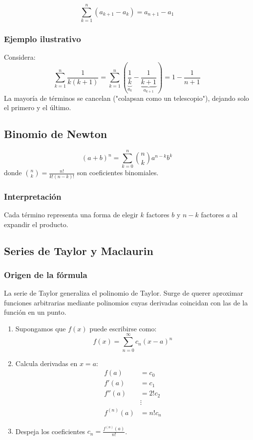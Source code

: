 \documentclass[letterpaper, 12pt]{article}
\begin{document}
	\[
	\sum_{k=1}^n (a_{k+1} - a_k) = a_{n+1} - a_1
	\]
	
	\subsubsection{Ejemplo ilustrativo}
	Considera:
	\[
	\sum_{k=1}^n \frac{1}{k(k+1)} = \sum_{k=1}^n \left( \underbrace{\frac{1}{k}}_{a_k} - \underbrace{\frac{1}{k+1}}_{a_{k+1}} \right) = 1 - \frac{1}{n+1}
	\]
	La mayoría de términos se cancelan ("colapsan como un telescopio"), dejando solo el primero y el último.
	
	\subsection{Binomio de Newton}
	
	\[
	(a + b)^n = \sum_{k=0}^n \binom{n}{k} a^{n-k}b^k
	\]
	donde $\binom{n}{k} = \frac{n!}{k!(n-k)!}$ son coeficientes binomiales.
	
	\subsubsection{Interpretación}
	Cada término representa una forma de elegir $k$ factores $b$ y $n-k$ factores $a$ al expandir el producto.
	
	\subsection{Series de Taylor y Maclaurin}
	
	\subsubsection{Origen de la fórmula}
	
	La serie de Taylor generaliza el polinomio de Taylor. Surge de querer aproximar funciones arbitrarias mediante polinomios cuyas derivadas coincidan con las de la función en un punto.
	
	\begin{enumerate}
		\item Supongamos que $f(x)$ puede escribirse como:
		\[
		f(x) = \sum_{n=0}^\infty c_n (x-a)^n
		\]
		
		\item Calcula derivadas en $x = a$:
		\begin{align*}
			f(a) &= c_0 \\
			f'(a) &= c_1 \\
			f''(a) &= 2! c_2 \\
			&\vdots \\
			f^{(n)}(a) &= n! c_n
		\end{align*}
		
		\item Despeja los coeficientes $c_n = \frac{f^{(n)}(a)}{n!}$.
	\end{enumerate}
	
\end{document}
